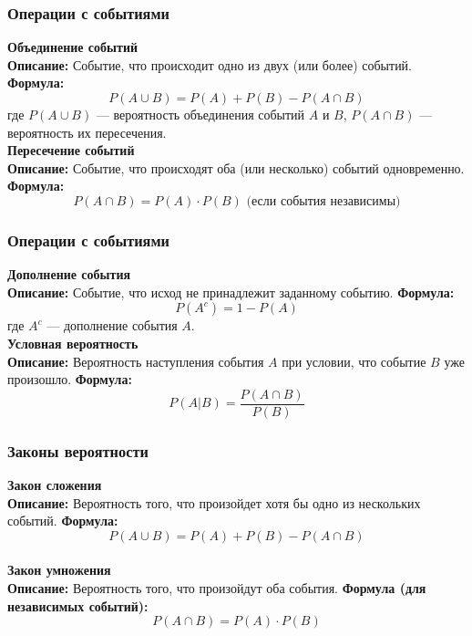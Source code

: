 \documentclass[aspectratio=169]{beamer}
\begin{document}
\begin{frame}
\frametitle{Операции с событиями}
\textbf{Объединение событий}
\newline\\
\textbf{Описание:} Событие, что происходит одно из двух (или более) событий.
\newline
\textbf{Формула:}
  \[
  P(A \cup B) = P(A) + P(B) - P(A \cap B)
  \]
где \( P(A \cup B) \) — вероятность объединения событий \( A \) и \( B \), \( P(A \cap B) \) — вероятность их пересечения.
\newline\\
\textbf{Пересечение событий}
\newline\\
\textbf{Описание:} Событие, что происходят оба (или несколько) событий одновременно.
\newline
\textbf{Формула:}
  \[
  P(A \cap B) = P(A) \cdot P(B) \text{ (если события независимы)}
  \]
\end{frame}

\begin{frame}
\frametitle{Операции с событиями}
\textbf{Дополнение события}
\newline\\
\textbf{Описание:} Событие, что исход не принадлежит заданному событию.
\newline
\textbf{Формула:}
  \[
  P(A^c) = 1 - P(A)
  \]
где \( A^c \) — дополнение события \( A \).
\newline\\
\textbf{Условная вероятность}
\newline\\
\textbf{Описание:} Вероятность наступления события \( A \) при условии, что событие \( B \) уже произошло.
\newline
\textbf{Формула:}
  \[
  P(A | B) = \frac{P(A \cap B)}{P(B)}
  \]
\end{frame}

\begin{frame}
\frametitle{Законы вероятности}
\textbf{Закон сложения}
\newline\\
\textbf{Описание:} Вероятность того, что произойдет хотя бы одно из нескольких событий.
\newline
\textbf{Формула:}
  \[
  P(A \cup B) = P(A) + P(B) - P(A \cap B)
  \]
\newline\\
\textbf{Закон умножения}
\newline\\
\textbf{Описание:} Вероятность того, что произойдут оба события.
\newline
\textbf{Формула (для независимых событий):}
  \[
  P(A \cap B) = P(A) \cdot P(B)
  \]
\end{frame}
\end{document}
